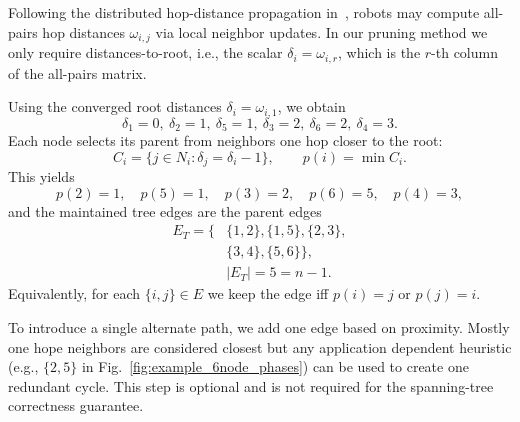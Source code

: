 \documentclass[conference]{IEEEconf}
\theoremstyle{plain}
\begin{document}
Following the distributed hop-distance propagation in~\cite{venkateswaran2024}, robots may compute all-pairs hop distances $\omega_{i,j}$ via local neighbor updates.
In our pruning method we only require distances-to-root, i.e., the scalar $\delta_i=\omega_{i,r}$, which is the $r$-th column of the all-pairs matrix.

Using the converged root distances $\delta_i=\omega_{i,1}$, we obtain
\[
\delta_1=0,\ \delta_2=1,\ \delta_5=1,\ \delta_3=2,\ \delta_6=2,\ \delta_4=3.
\]
Each node selects its parent from neighbors one hop closer to the root:
\[
C_i=\{j\in N_i:\delta_j=\delta_i-1\},\qquad p(i)=\min C_i.
\]
This yields
\[
p(2)=1,\quad p(5)=1,\quad p(3)=2,\quad p(6)=5,\quad p(4)=3,
\]
and the maintained tree edges are the parent edges
\begin{equation*}
\begin{aligned}
E_T=\{&\{1,2\},\{1,5\},\{2,3\},\\
      &\{3,4\},\{5,6\}\},\\
&|E_T|=5=n-1.
\end{aligned}
\end{equation*}
Equivalently, for each $\{i,j\}\in E$ we keep the edge iff $p(i)=j$ or $p(j)=i$.

To introduce a single alternate path, we add one edge based on proximity. Mostly one hope neighbors are considered closest but any application dependent heuristic (e.g., $\{2,5\}$ in Fig.~\ref{fig:example_6node_phases}) can be used to create one redundant cycle.
This step is optional and is not required for the spanning-tree correctness guarantee.
\end{document}
